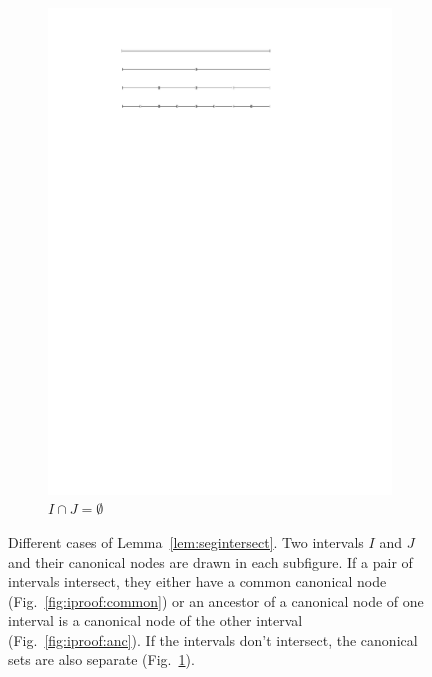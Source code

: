 \documentclass[english,gradu]{tktltiki2018}
\begin{document}
\begin{figure}
\begin{subfigure}[t]{0.32\textwidth}
		\includegraphics[width=\textwidth,page=2]{fig/iproof}
		\caption{$I\cap J=\emptyset$}\label{fig:iproof:no}
	\end{subfigure}
	\caption{Different cases of Lemma~\ref{lem:segintersect}.
	Two intervals $I$ and $J$ and their canonical nodes are drawn in each subfigure.
	If a pair of intervals intersect, they either have a common canonical node (Fig.~\ref{fig:iproof:common}) or an ancestor of a canonical node of one interval is a canonical node of the other interval (Fig.~\ref{fig:iproof:anc}).
	If the intervals don't intersect, the canonical sets are also separate (Fig.~\ref{fig:iproof:no}).}\label{fig:iproof}
\end{figure}
\end{document}

